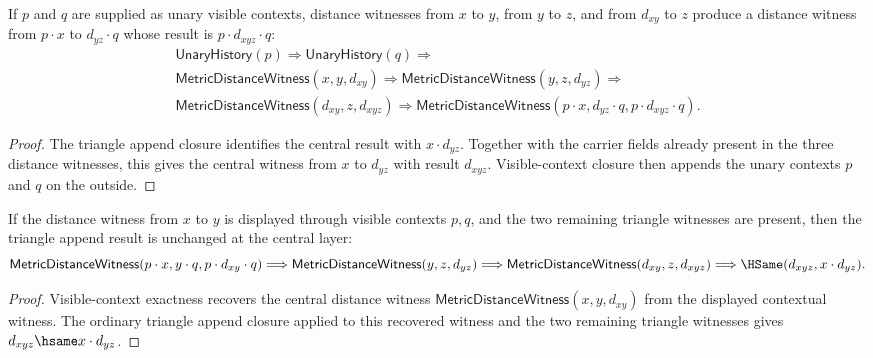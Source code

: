 \begin{theorem}
\label{thm:metric-distance-witness-triangle-append-context-closed}
If $p$ and $q$ are supplied as unary visible contexts, distance witnesses from
$x$ to $y$, from $y$ to $z$, and from $d_{xy}$ to $z$ produce a distance witness
from $p\cdot x$ to $d_{yz}\cdot q$ whose result is
$p\cdot d_{xyz}\cdot q$:
$$
\begin{array}{l}
\mathsf{UnaryHistory}(p)\Longrightarrow
\mathsf{UnaryHistory}(q)\Longrightarrow
\\
\mathsf{MetricDistanceWitness}(x,y,d_{xy})\Longrightarrow
\mathsf{MetricDistanceWitness}(y,z,d_{yz})\Longrightarrow
\\
\mathsf{MetricDistanceWitness}(d_{xy},z,d_{xyz})\Longrightarrow
\mathsf{MetricDistanceWitness}(p\cdot x,d_{yz}\cdot q,p\cdot d_{xyz}\cdot q).
\end{array}
$$
\end{theorem}
\begin{proof}
The triangle append closure identifies the central result with $x\cdot d_{yz}$.
Together with the carrier fields already present in the three distance witnesses,
this gives the central witness from $x$ to $d_{yz}$ with result $d_{xyz}$.
Visible-context closure then appends the unary contexts $p$ and $q$ on the
outside.
\end{proof}

\begin{theorem}
\label{thm:metric-distance-witness-visible-context-triangle-append-closed}
If the distance witness from $x$ to $y$ is displayed through visible contexts
$p,q$, and the two remaining triangle witnesses are present, then the triangle
append result is unchanged at the central layer:
$$
\mathsf{MetricDistanceWitness}(p\cdot x,y\cdot q,p\cdot d_{xy}\cdot q)
\Longrightarrow
\mathsf{MetricDistanceWitness}(y,z,d_{yz})
\Longrightarrow
\mathsf{MetricDistanceWitness}(d_{xy},z,d_{xyz})
\Longrightarrow
\HSame(d_{xyz},x\cdot d_{yz}).
$$
\end{theorem}
\begin{proof}
Visible-context exactness recovers the central distance witness
$\mathsf{MetricDistanceWitness}(x,y,d_{xy})$ from the displayed contextual
witness. The ordinary triangle append closure applied to this recovered witness
and the two remaining triangle witnesses gives
$d_{xyz}\hsame x\cdot d_{yz}$.
\end{proof}

